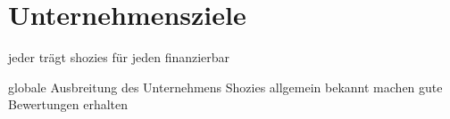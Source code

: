\chapter{Unternehmensziele}
\label{cha:2}
jeder trägt shozies
für jeden finanzierbar

globale Ausbreitung des Unternehmens
Shozies allgemein bekannt machen
gute Bewertungen erhalten